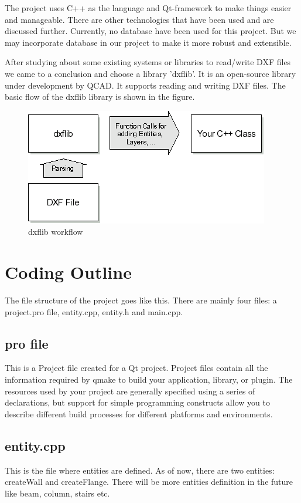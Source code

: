 The project uses C++ as the language and Qt-framework to make things easier and manageable. There are other technologies that have been used and are discussed further. Currently, no database have been used for this project. But we may incorporate database in our project to make it more robust and extensible.

After studying about some existing systems or libraries to read/write DXF files we came to a conclusion and choose a library 'dxflib'. It is an open-source library under development by QCAD. It supports reading and writing DXF files. The basic flow of the dxflib library is shown in the figure.


\begin{figure}
\centering \includegraphics[scale=.9]{images/dxflib.png}
\caption{dxflib workflow}
\end{figure}


\section{Coding Outline}
The file structure of the project goes like this. There are mainly four files: a project.pro file, entity.cpp, entity.h and main.cpp.

\subsection*{pro file}
This is a Project file created for a Qt project. Project files contain all the information required by qmake to build your application, library, or plugin. The resources used by your project are generally specified using a series of declarations, but support for simple programming constructs allow you to describe different build processes for different platforms and environments.

\subsection*{entity.cpp}
This is the file where entities are defined. As of now, there are two entities: createWall and createFlange. There will be more entities definition in the future like beam, column, stairs etc.

